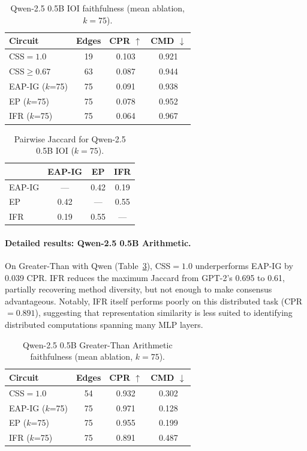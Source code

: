 \documentclass[11pt,a4paper]{article}
\newcommand{\css}{\textsc{CSS}}
\begin{document}
\begin{table}[t]
\centering
\small
\caption{Qwen-2.5 0.5B IOI faithfulness (mean ablation, $k\!=\!75$).}
\label{tab:qwen_ioi}
\begin{tabular}{@{}lccc@{}}
\toprule
Circuit & Edges & CPR $\uparrow$ & CMD $\downarrow$ \\
\midrule
\css{}$=1.0$ & 19 & 0.103 & 0.921 \\
\css{}$\geq 0.67$ & 63 & 0.087 & 0.944 \\
EAP-IG ($k$=75) & 75 & 0.091 & 0.938 \\
EP ($k$=75) & 75 & 0.078 & 0.952 \\
IFR ($k$=75) & 75 & 0.064 & 0.967 \\
\bottomrule
\end{tabular}
\end{table}

\begin{table}[t]
\centering
\small
\caption{Pairwise Jaccard for Qwen-2.5 0.5B IOI ($k\!=\!75$).}
\label{tab:qwen_ioi_jaccard}
\begin{tabular}{@{}lccc@{}}
\toprule
 & EAP-IG & EP & IFR \\
\midrule
EAP-IG & --- & 0.42 & 0.19 \\
EP & 0.42 & --- & 0.55 \\
IFR & 0.19 & 0.55 & --- \\
\bottomrule
\end{tabular}
\end{table}

\paragraph{Detailed results: Qwen-2.5 0.5B Arithmetic.}
On Greater-Than with Qwen (Table~\ref{tab:qwen_arith}), \css{}$=1.0$ underperforms EAP-IG by 0.039 CPR.
IFR reduces the maximum Jaccard from GPT-2's 0.695 to 0.61, partially recovering method diversity, but not enough to make consensus advantageous.
Notably, IFR itself performs poorly on this distributed task (CPR$=0.891$), suggesting that representation similarity is less suited to identifying distributed computations spanning many MLP layers.

\begin{table}[t]
\centering
\small
\caption{Qwen-2.5 0.5B Greater-Than Arithmetic faithfulness (mean ablation, $k\!=\!75$).}
\label{tab:qwen_arith}
\begin{tabular}{@{}lccc@{}}
\toprule
Circuit & Edges & CPR $\uparrow$ & CMD $\downarrow$ \\
\midrule
\css{}$=1.0$ & 54 & 0.932 & 0.302 \\
EAP-IG ($k$=75) & 75 & 0.971 & 0.128 \\
EP ($k$=75) & 75 & 0.955 & 0.199 \\
IFR ($k$=75) & 75 & 0.891 & 0.487 \\
\bottomrule
\end{tabular}
\end{table}
\end{document}
